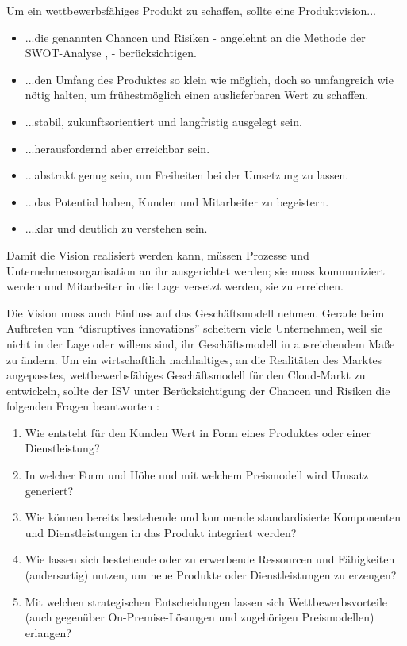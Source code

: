 Um ein wettbewerbsfähiges Produkt zu schaffen, sollte eine Produktvision...
\begin{itemize}
	\item ...die genannten Chancen und Risiken - angelehnt an die 
Methode der 
SWOT-Analyse 
, 
 - berücksichtigen. 
	\item ...den Umfang des Produktes so klein wie möglich, doch so 
umfangreich wie nötig halten, um frühestmöglich einen auslieferbaren Wert zu 
schaffen.
	\item ...stabil, zukunftsorientiert und langfristig ausgelegt sein.
	\item ...herausfordernd aber erreichbar sein.
	\item ...abstrakt genug sein, um Freiheiten bei der Umsetzung zu 
lassen.
	\item ...das Potential haben, Kunden und Mitarbeiter zu begeistern.
	\item ...klar und deutlich zu verstehen sein.
\end{itemize}
Damit die Vision realisiert werden kann, müssen Prozesse und 
Unternehmensorganisation an ihr ausgerichtet werden; sie muss kommuniziert 
werden und Mitarbeiter in die Lage versetzt werden, sie zu erreichen. 

Die Vision muss auch Einfluss auf das Geschäftsmodell nehmen. Gerade beim 
Auftreten von "`disruptives innovations"' scheitern viele Unternehmen, 
weil sie nicht in der Lage oder willens sind, ihr Geschäftsmodell in 
ausreichendem Maße zu ändern. 
 Um ein 
wirtschaftlich nachhaltiges, an die Realitäten des Marktes angepasstes, 
wettbewerbsfähiges Geschäftsmodell für den Cloud-Markt zu entwickeln, sollte 
der ISV unter Berücksichtigung der Chancen und Risiken die folgenden Fragen 
beantworten :
\begin{enumerate}
	\item Wie entsteht für den Kunden Wert in Form eines Produktes oder 
		einer Dienstleistung?
	\item In welcher Form und Höhe und mit welchem Preismodell wird Umsatz 
generiert? 
	\item Wie können bereits bestehende und kommende standardisierte 
Komponenten und Dienstleistungen in das Produkt integriert werden?
	\item Wie lassen sich bestehende oder zu erwerbende Ressourcen und 
Fähigkeiten (andersartig) nutzen, um neue Produkte oder Dienstleistungen zu 
erzeugen?
	\item Mit welchen strategischen Entscheidungen lassen sich 
Wettbewerbsvorteile (auch gegenüber On-Premise-Lösungen und 
zugehörigen Preismodellen) erlangen?
\end{enumerate}

